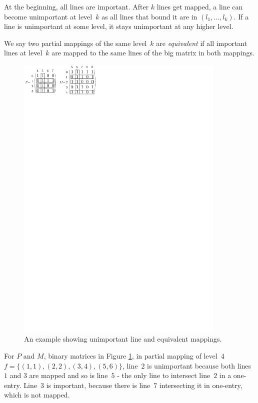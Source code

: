 At the beginning, all lines are important. After $k$ lines get mapped, a line can become unimportant at level~$k$ as all lines that bound it are in $(l_1,\dots,l_k)$. If a line is unimportant at some level, it stays unimportant at any higher level.
\begin{defn}
We say two partial mappings of the same level~$k$ are \emph{equivalent} if all important lines at level~$k$ are mapped to the same lines of the big matrix in both mappings.
\end{defn}
\begin{figure}[h!]
\centering
\includegraphics[width=100mm]{../img/equivalent.pdf}
\caption{An example showing unimportant line and equivalent mappings.}
\label{equivalent}
\end{figure}
For $P$ and $M$, binary matrices in Figure \ref{equivalent}, in partial mapping of level~$4$ $f=\{(1,1),(2,2),(3,4),(5,6)\}$, line~$2$ is unimportant because both lines $1$ and $3$ are mapped and so is line~$5$ - the only line to intersect line~$2$ in a one-entry. Line~$3$ is important, because there is line~$7$ intersecting it in one-entry, which is not mapped.

